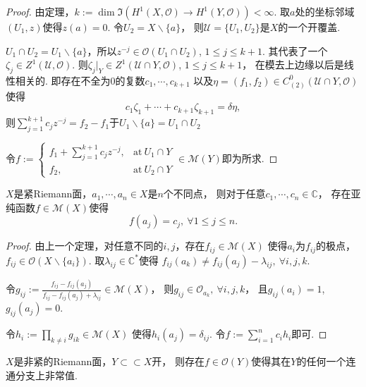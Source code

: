 \begin{proof}
	由定理，$k:=\dim \Im(H^1(X,\mathcal{O})\rightarrow H^1(Y,\mathcal{O}))<\infty$. 
    取$a$处的坐标邻域$(U_1,z)$使得$z(a)=0$. 令$U_2=X\backslash \{a\}$，
    则$\mathscr{U}=\{U_1,U_2\}$是$X$的一个开覆盖.

	$U_1\cap U_2=U_1\backslash \{a\}$，所以$z^{-j}\in \mathcal{O}(U_1\cap U_2)$, 
    $1\leq j\leq k+1$. 其代表了一个$\zeta_j\in Z^1(\mathscr{U}, \mathcal{O})$. 
    则$\zeta_j|_Y\in Z^1(\mathscr{U}\cap Y,\mathcal{O})$, $1\leq j\leq k+1$，
    在模去上边缘以后是线性相关的. 即存在不全为$0$的复数$c_1,\cdots, c_{k+1}$
    以及$\eta=(f_1,f_2)\in C^0_{(2)}(\mathscr{U}\cap Y,\mathcal{O})$使得
	$$c_1\zeta_1+\cdots+c_{k+1}\zeta_{k+1}=\delta \eta,$$
	则$\sum\limits_{j=1}^{k+1}c_jz^{-j}=f_2-f_1$于$U_1\backslash \{a\}=U_1\cap U_2$

	令$f:=\begin{cases} f_1+\sum\limits_{j=1}^{k+1}c_jz^{-j}, &\text{at}\ U_1\cap Y\\
	f_2, &\text{at}\ U_2\cap Y \end{cases} \in \mathscr{M}(Y)$即为所求.
\end{proof}
		
\begin{corollary}[插值问题]
	$X$是紧Riemann面，$a_1,\cdots, a_n\in X$是$n$个不同点，
    则对于任意$c_1,\cdots,c_n\in \mathbb{C}$，
    存在亚纯函数$f\in \mathscr{M}(X)$使得
	$$f(a_j)=c_j, \ \forall 1\leq j\leq n.$$
\end{corollary}
		
\begin{proof}
	由上一个定理，对任意不同的$i,j$，存在$f_{ij}\in \mathscr{M}(X)$
    使得$a_i$为$f_{ij}$的极点，$f_{ij}\in \mathcal{O}(X\backslash\{a_i\})$. 
    取$\lambda_{ij}\in \mathbb{C}^*$使得
    $f_{ij}(a_k)\neq f_{ij}(a_j)-\lambda_{ij}, \ \forall i,j,k$.

	令$g_{ij}:=\frac{f_{ij}-f_{ij}(a_j)}{f_{ij}-f_{ij}(a_j)+\lambda_{ij}}\in \mathscr{M}(X)$，
    则$g_{ij}\in \mathcal{O}_{a_k}, \ \forall i,j,k$，
    且$g_{ij}(a_i)=1$, $g_{ij}(a_j)=0$.

	令$h_i:=\prod\limits_{k\neq i} g_{ik}\in \mathscr{M}(X)$
    使得$h_i(a_j)=\delta_{ij}$. 令$f:=\sum\limits_{i=1}^n c_i h_i$即可.
\end{proof}

\begin{corollary}
	$X$是非紧的Riemann面，$Y\subset \subset X$开，
    则存在$f\in \mathcal{O}(Y)$使得其在$Y$的任何一个连通分支上非常值.
\end{corollary}

